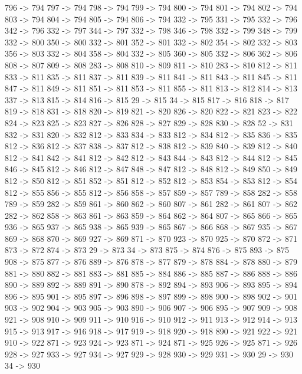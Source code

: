 {	796 -> 794
	797 -> 794
	798 -> 794
	799 -> 794
	800 -> 794
	801 -> 794
	802 -> 794
	803 -> 794
	804 -> 794
	805 -> 794
	806 -> 794
	332 -> 795
	331 -> 795
	332 -> 796
	342 -> 796
	332 -> 797
	344 -> 797
	332 -> 798
	346 -> 798
	332 -> 799
	348 -> 799
	332 -> 800
	350 -> 800
	332 -> 801
	352 -> 801
	332 -> 802
	354 -> 802
	332 -> 803
	356 -> 803
	332 -> 804
	358 -> 804
	332 -> 805
	360 -> 805
	332 -> 806
	362 -> 806
	808 -> 807
	809 -> 808
	283 -> 808
	810 -> 809
	811 -> 810
	283 -> 810
	812 -> 811
	833 -> 811
	835 -> 811
	837 -> 811
	839 -> 811
	841 -> 811
	843 -> 811
	845 -> 811
	847 -> 811
	849 -> 811
	851 -> 811
	853 -> 811
	855 -> 811
	813 -> 812
	814 -> 813
	337 -> 813
	815 -> 814
	816 -> 815
	29 -> 815
	34 -> 815
	817 -> 816
	818 -> 817
	819 -> 818
	831 -> 818
	820 -> 819
	821 -> 820
	826 -> 820
	822 -> 821
	823 -> 822
	824 -> 823
	825 -> 823
	827 -> 826
	828 -> 827
	829 -> 828
	830 -> 828
	52 -> 831
	832 -> 831
	820 -> 832
	812 -> 833
	834 -> 833
	812 -> 834
	812 -> 835
	836 -> 835
	812 -> 836
	812 -> 837
	838 -> 837
	812 -> 838
	812 -> 839
	840 -> 839
	812 -> 840
	812 -> 841
	842 -> 841
	812 -> 842
	812 -> 843
	844 -> 843
	812 -> 844
	812 -> 845
	846 -> 845
	812 -> 846
	812 -> 847
	848 -> 847
	812 -> 848
	812 -> 849
	850 -> 849
	812 -> 850
	812 -> 851
	852 -> 851
	812 -> 852
	812 -> 853
	854 -> 853
	812 -> 854
	812 -> 855
	856 -> 855
	812 -> 856
	858 -> 857
	859 -> 857
	789 -> 858
	282 -> 858
	789 -> 859
	282 -> 859
	861 -> 860
	862 -> 860
	807 -> 861
	282 -> 861
	807 -> 862
	282 -> 862
	858 -> 863
	861 -> 863
	859 -> 864
	862 -> 864
	807 -> 865
	866 -> 865
	936 -> 865
	937 -> 865
	938 -> 865
	939 -> 865
	867 -> 866
	868 -> 867
	935 -> 867
	869 -> 868
	870 -> 869
	927 -> 869
	871 -> 870
	923 -> 870
	925 -> 870
	872 -> 871
	873 -> 872
	874 -> 873
	29 -> 873
	34 -> 873
	875 -> 874
	876 -> 875
	893 -> 875
	908 -> 875
	877 -> 876
	889 -> 876
	878 -> 877
	879 -> 878
	884 -> 878
	880 -> 879
	881 -> 880
	882 -> 881
	883 -> 881
	885 -> 884
	886 -> 885
	887 -> 886
	888 -> 886
	890 -> 889
	892 -> 889
	891 -> 890
	878 -> 892
	894 -> 893
	906 -> 893
	895 -> 894
	896 -> 895
	901 -> 895
	897 -> 896
	898 -> 897
	899 -> 898
	900 -> 898
	902 -> 901
	903 -> 902
	904 -> 903
	905 -> 903
	890 -> 906
	907 -> 906
	895 -> 907
	909 -> 908
	921 -> 908
	910 -> 909
	911 -> 910
	916 -> 910
	912 -> 911
	913 -> 912
	914 -> 913
	915 -> 913
	917 -> 916
	918 -> 917
	919 -> 918
	920 -> 918
	890 -> 921
	922 -> 921
	910 -> 922
	871 -> 923
	924 -> 923
	871 -> 924
	871 -> 925
	926 -> 925
	871 -> 926
	928 -> 927
	933 -> 927
	934 -> 927
	929 -> 928
	930 -> 929
	931 -> 930
	29 -> 930
	34 -> 930
}
